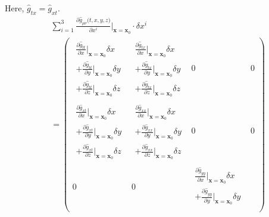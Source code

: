 \documentclass[english]{article}
\begin{document}
Here, $\hat{g}_{tx}=\hat{g}_{xt}$. 
\begin{align*}
 & \sum^{3}_{i=1}\frac{\partial\hat{g}_{\mu\nu}\biggl(t,x,y,z\biggr)}{\partial x^{i}}\Bigg|_{\boldsymbol{x}=\boldsymbol{x}_{0}}\cdot\delta x^{i}\\
 & =\begin{pmatrix}\begin{array}{c}
\frac{\partial\hat{g}_{tt}}{\partial x}\big|_{\boldsymbol{x}=\boldsymbol{x}_{0}}\delta x\\
+\frac{\partial\hat{g}_{tt}}{\partial y}\big|_{\boldsymbol{x}=\boldsymbol{x}_{0}}\delta y\\
+\frac{\partial\hat{g}_{tt}}{\partial z}\big|_{\boldsymbol{x}=\boldsymbol{x}_{0}}\delta z
\end{array} & \begin{array}{c}
\frac{\partial\hat{g}_{tx}}{\partial x}\big|_{\boldsymbol{x}=\boldsymbol{x}_{0}}\delta x\\
+\frac{\partial\hat{g}_{tx}}{\partial y}\big|_{\boldsymbol{x}=\boldsymbol{x}_{0}}\delta y\\
+\frac{\partial\hat{g}_{tx}}{\partial z}\big|_{\boldsymbol{x}=\boldsymbol{x}_{0}}\delta z
\end{array} & 0 & 0\\
\begin{array}{c}
\frac{\partial\hat{g}_{xt}}{\partial x}\big|_{\boldsymbol{x}=\boldsymbol{x}_{0}}\delta x\\
+\frac{\partial\hat{g}_{xt}}{\partial y}\big|_{\boldsymbol{x}=\boldsymbol{x}_{0}}\delta y\\
+\frac{\partial\hat{g}_{xt}}{\partial z}\big|_{\boldsymbol{x}=\boldsymbol{x}_{0}}\delta z
\end{array} & \begin{array}{c}
\frac{\partial\hat{g}_{xx}}{\partial x}\big|_{\boldsymbol{x}=\boldsymbol{x}_{0}}\delta x\\
+\frac{\partial\hat{g}_{xx}}{\partial y}\big|_{\boldsymbol{x}=\boldsymbol{x}_{0}}\delta y\\
+\frac{\partial\hat{g}_{xx}}{\partial z}\big|_{\boldsymbol{x}=\boldsymbol{x}_{0}}\delta z
\end{array} & 0 & 0\\
0 & 0 & \begin{array}{c}
\frac{\partial\hat{g}_{yy}}{\partial x}\big|_{\boldsymbol{x}=\boldsymbol{x}_{0}}\delta x\\
+\frac{\partial\hat{g}_{yy}}{\partial y}\big|_{\boldsymbol{x}=\boldsymbol{x}_{0}}\delta y\\

\end{array}
\end{pmatrix}
\end{align*}
\end{document}

